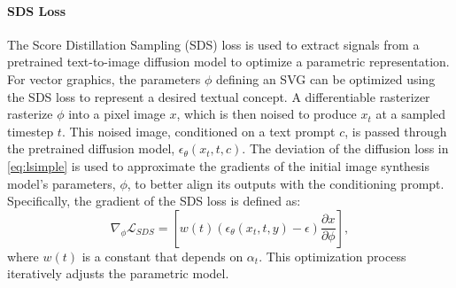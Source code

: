 \paragraph{\textbf{SDS Loss}}
The Score Distillation Sampling (SDS) loss \cite{Poole2022DreamFusionTU} is used to extract signals from a pretrained text-to-image diffusion model to optimize a parametric representation. For vector graphics, the parameters $\phi$ defining an SVG can be optimized using the SDS loss to represent a desired textual concept. A differentiable rasterizer \cite{Li2020DifferentiableVG} rasterize $\phi$ into a pixel image $x$, which is then noised to produce $x_t$ at a sampled timestep $t$. This noised image, conditioned on a text prompt $c$, is passed through the pretrained diffusion model, $\epsilon_\theta(x_t, t, c)$.
The deviation of the diffusion loss in \cref{eq:lsimple} is used to approximate the gradients of the initial image synthesis model's parameters, $\phi$, to better align its outputs with the conditioning prompt. Specifically, the gradient of the SDS loss is defined as:
\begin{equation}\label{eq:sds_loss}
    \nabla_\phi \mathcal{L}_{SDS} = \left[ w(t)(\epsilon_\theta(x_t,t,y) - \epsilon) \frac{\partial x}{\partial \phi} \right] ,
\end{equation}
where $w(t)$ is a constant that depends on $\alpha_t$. This optimization process iteratively adjusts the parametric model.



